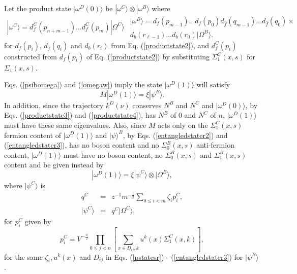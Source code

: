 \documentclass[twocolumn,amsmath,amssymb]{revtex4-1}
\begin{document}
Let the product state $|\omega^D(0) \rangle $ be
$|\omega^C \rangle  \otimes |\omega^B \rangle $ where
\begin{subequations}
  \begin{multline}
\label{productstate3}
|\omega^C \rangle  = 
d^C_f( p_{n+m-1}) ... d^C_f( p_m) |\Omega^C \rangle 
  \end{multline}
  \begin{multline}
    \label{productstate4}
    |\omega^B \rangle  = 
d_f( p_{m-1}) ... d_f( p_0) 
    d_{\bar{f}}( q_{m - 1}) ... d_{\bar{f}}( q_0) \times \\
d_b( r_{\ell-1}) ... d_b( r_0) |\Omega^B \rangle .
\end{multline}
\end{subequations}
for $d_f( p_i)$, $d_{\bar{f}}( q_i)$ and $d_b( r_i)$ from Eq. (\ref{productstate2}),
and $d_f^C( p_i)$ constructed from $d_f( p_i)$ of Eq. (\ref{productstate2})
by substituting
$\Sigma_1^C(x, s)$ for $\Sigma_1(x, s)$.

Eqs. (\ref{psibomega}) and (\ref{omegaw})  imply the state $|\omega^D(1) \rangle $ will satisfy
\begin{equation}
  \label{omegad1}
  M |\omega^D(1) \rangle  = \xi |\psi^B \rangle .
\end{equation}
In addition,
since the trajectory $k^D(\nu)$ conserves $N^B$ and $N^C$ and $|\omega^D(0) \rangle $,
by Eqs. (\ref{productstate3}) and (\ref{productstate4}), has $N^B$ of 0 and
$N^C$ of $n$, $|\omega^D(1) \rangle $ must have these same eigenvalues.
Also, since $M$ acts only on the $\Sigma_1^C(x,s)$ fermion content of $|\omega^D(1) \rangle $
and $|\psi \rangle ^B$, by Eqs. (\ref{entangledstater2}) and (\ref{entangledstater3}),
has no boson content and no $\Sigma_0^B(x,s)$ anti-fermion content, 
$|\omega^D(1) \rangle $ must have no boson content, no $\Sigma_0^B(x,s)$ and $\Sigma_1^B(x,s)$ content
and be given instead by
\begin{equation}
  \label{omegad11}
  |\omega^D(1) \rangle  = \xi |\psi^C \rangle  \otimes |\Omega^B \rangle ,
\end{equation}
where $|\psi^C \rangle $ is
\begin{subequations}
\begin{eqnarray}
\label{entangledstater4}
q^C &=& z^{-1} m^{-\frac{1}{2}}\sum_{0 \le i < m} \zeta_i p^C_i, \\ 
\label{entangledstater5}
|\psi^C \rangle   &=&  q^C|\Omega^C \rangle ,
\end{eqnarray}
\end{subequations}
for $p^C_i$ given by
\begin{equation}
\label{pstatesrc}
p^C_i = 
V^{-\frac{n}{2}}\prod_{0 \le j <n} \left[\sum_{x \in D_{ij},k} u^k(x) \Sigma^C_1( x,k )\right],
\end{equation}
for the same $\zeta_i, u^k(x)$ and $D_{ij}$ in Eqs. (\ref{pstatesr}) - (\ref{entangledstater3})
for $|\psi^B \rangle $.
\end{document}
